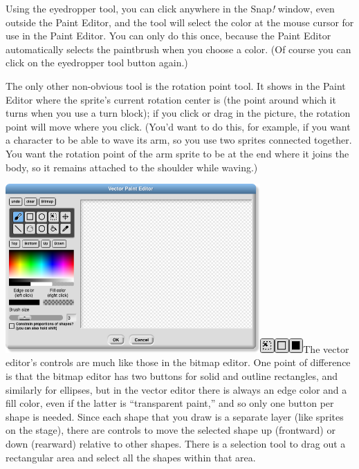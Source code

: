 Using the eyedropper tool, you can click anywhere in the Snap\emph{!}
window, even outside the Paint Editor, and the tool will select the
color at the mouse cursor for use in the Paint Editor. You can only do
this once, because the Paint Editor automatically selects the paintbrush
when you choose a color. (Of course you can click on the eyedropper tool
button again.)

The only other non-obvious tool is the rotation point tool. It shows in
the Paint Editor where the sprite's current rotation center is (the
point around which it turns when you use a turn block); if you click or
drag in the picture, the rotation point will move where you click.
(You'd want to do this, for example, if you want a character to be able
to wave its arm, so you use two sprites connected together. You want the
rotation point of the arm sprite to be at the end where it joins the
body, so it remains attached to the shoulder while waving.)

\includegraphics[width=3.83611in,height=2.54861in]{media/image1095.png}\includegraphics[width=0.21528in,height=0.21528in]{media/image1096.png}\includegraphics[width=0.21528in,height=0.21528in]{media/image1097.png}\includegraphics[width=0.21528in,height=0.21528in]{media/image1098.png}The
vector editor's controls are much like those in the bitmap editor. One
point of difference is that the bitmap editor has two buttons for solid
and outline rectangles, and similarly for ellipses, but in the vector
editor there is always an edge color and a fill color, even if the
latter is ``transparent paint,'' and so only one button per shape is
needed. Since each shape that you draw is a separate layer (like sprites
on the stage), there are controls to move the selected shape up
(frontward) or down (rearward) relative to other shapes. There is a
selection tool to drag out a rectangular area and select all the shapes
within that area.

